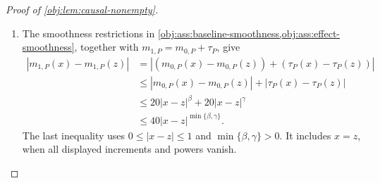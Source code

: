 \documentclass[11pt]{article}
\begin{document}
\begin{proof}[Proof of \cref{obj:lem:causal-nonempty}]
\begin{enumerate}
For every Borel \(\mathsf E\subseteq\mathbb R\), evaluation on the two arm slices now gives, at almost every \(x\),
\[
\begin{aligned}
(1-e_P(x))\widetilde Q_{0,P}(\mathsf E\mid x)
&=(1-e_P(x))Q_{0,P}(\mathsf E\mid x),\\
e_P(x)\widetilde Q_{1,P}(\mathsf E\mid x)
&=e_P(x)Q_{1,P}(\mathsf E\mid x).
\end{aligned}
\]
Both weights are strictly positive by \cref{obj:ass:overlap}. Cancelling them proves
\[
\widetilde Q_{0,P}(\,\cdot\mid x)=Q_{0,P}(\,\cdot\mid x),
\qquad
\widetilde Q_{1,P}(\,\cdot\mid x)=Q_{1,P}(\,\cdot\mid x)
\qquad\text{for \(\lambda\)-almost every }x.
\]
The arm-mean version identities consequently imply
\[
\begin{aligned}
\widetilde m_{0,P}(x)
&=\int y\,\widetilde Q_{0,P}(dy\mid x)
 =\int y\,Q_{0,P}(dy\mid x)
 =m_{0,P}(x),\\
\widetilde m_{1,P}(x)
&=\int y\,\widetilde Q_{1,P}(dy\mid x)
 =\int y\,Q_{1,P}(dy\mid x)
 =m_{1,P}(x)
\end{aligned}
\qquad\text{for \(\lambda\)-almost every }x.
\]
Continuity upgrades both equalities to pointwise equalities. Subtraction then gives
\[
\widetilde\tau_P
=\widetilde m_{1,P}-\widetilde m_{0,P}
=m_{1,P}-m_{0,P}
=\tau_P
\qquad\text{pointwise on }[0,1].
\]

\item The smoothness restrictions in
\cref{obj:ass:baseline-smoothness,obj:ass:effect-smoothness}, together with
\(m_{1,P}=m_{0,P}+\tau_P\), give
\[
\begin{aligned}
|m_{1,P}(x)-m_{1,P}(z)|
&=|(m_{0,P}(x)-m_{0,P}(z))
   +(\tau_P(x)-\tau_P(z))|\\
&\le |m_{0,P}(x)-m_{0,P}(z)|
    +|\tau_P(x)-\tau_P(z)|\\
&\le20|x-z|^\beta+20|x-z|^\gamma\\
&\le40|x-z|^{\min\{\beta,\gamma\}}.
\end{aligned}
\]
The last inequality uses \(0\le|x-z|\le1\) and
\(\min\{\beta,\gamma\}>0\). It includes \(x=z\), when all displayed increments and powers vanish.


\end{enumerate}
\end{proof}
\end{document}
